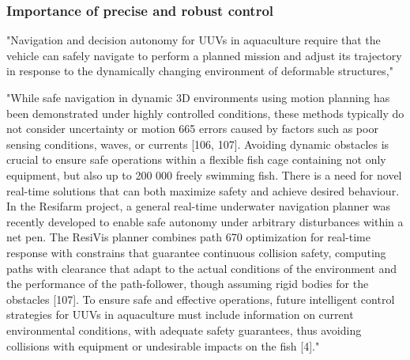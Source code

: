 \subsubsection{Importance of precise and robust control}

"Navigation and decision autonomy for UUVs in aquaculture require that the vehicle can safely navigate to perform a planned mission and adjust its trajectory in response to the dynamically changing environment of deformable structures,"

"While safe navigation in dynamic 3D environments using motion planning has been demonstrated under highly controlled conditions, these methods typically do not consider uncertainty or motion 665 errors caused by factors such as poor sensing conditions, waves, or currents [106, 107]. Avoiding dynamic obstacles  is crucial to ensure safe operations within a flexible fish cage containing not only equipment, but also up to 200 000 freely swimming fish. There is a need for novel real-time solutions that can both maximize safety and achieve desired behaviour. In the Resifarm project, a general real-time underwater navigation planner was recently developed to enable safe autonomy under arbitrary disturbances within a net pen. The ResiVis planner combines path 670 optimization for real-time response with constrains that guarantee continuous collision safety, computing paths with  clearance that adapt to the actual conditions of the environment and the performance of the path-follower, though assuming rigid bodies for the obstacles [107]. To ensure safe and effective operations, future intelligent control strategies for UUVs in aquaculture must include information on current environmental conditions, with adequate safety guarantees, thus avoiding collisions with equipment or undesirable impacts on the fish [4]."

\cite{evjemo2025aquaculture}

